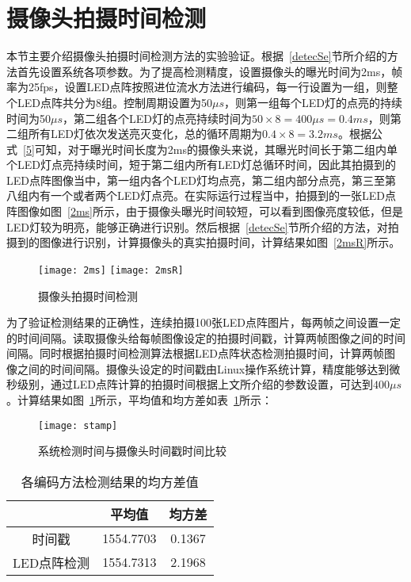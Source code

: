 \section{摄像头拍摄时间检测}

本节主要介绍摄像头拍摄时间检测方法的实验验证。根据~\ref{detecSe}节所介绍的方法首先设置系统各项参数。为了提高检测精度，设置摄像头的曝光时间为2ms，帧率为25fps，设置LED点阵按照进位流水方法进行编码，每一行设置为一组，则整个LED点阵共分为8组。控制周期设置为50$\mu s$，则第一组每个LED灯的点亮的持续时间为50$\mu s$，第二组各个LED灯的点亮持续时间为$50 \times 8 = 400\mu s = 0.4ms$，则第二组所有LED灯依次发送亮灭变化，总的循环周期为$0.4 \times 8 = 3.2ms$。根据公式~\ref{5}可知，对于曝光时间长度为2ms的摄像头来说，其曝光时间长于第二组内单个LED灯点亮持续时间，短于第二组内所有LED灯总循环时间，因此其拍摄到的LED点阵图像当中，第一组内各个LED灯均点亮，第二组内部分点亮，第三至第八组内有一个或者两个LED灯点亮。在实际运行过程当中，拍摄到的一张LED点阵图像如图~\ref{2ms}所示，由于摄像头曝光时间较短，可以看到图像亮度较低，但是LED灯较为明亮，能够正确进行识别。然后根据~\ref{detecSe}节所介绍的方法，对拍摄到的图像进行识别，计算摄像头的真实拍摄时间，计算结果如图~\ref{2msR}所示。

\begin{figure}[h] 
  \centering%
    {\texttt{[image: 2ms]}}
      {\texttt{[image: 2msR]}}
  \caption{摄像头拍摄时间检测}
\end{figure}

为了验证检测结果的正确性，连续拍摄100张LED点阵图片，每两帧之间设置一定的时间间隔。读取摄像头给每帧图像设定的拍摄时间戳，计算两帧图像之间的时间间隔。同时根据拍摄时间检测算法根据LED点阵状态检测拍摄时间，计算两帧图像之间的时间间隔。摄像头设定的时间戳由Linux操作系统计算，精度能够达到微秒级别，通过LED点阵计算的拍摄时间根据上文所介绍的参数设置，可达到$400\mu s$。计算结果如图~\ref{stamp}所示，平均值和均方差如表~\ref{codingT}所示：

\begin{figure}[h] 
  \centering
  \texttt{[image: stamp]}
  \caption{系统检测时间与摄像头时间戳时间比较}
    \label{stamp}
\end{figure}

\begin{table}[h]
  \centering
  \caption{各编码方法检测结果的均方差值} 
  \label{codingT}
  \begin{tabular}{|c|c|c|}\hline
  &  平均值 &  均方差 \\ \hline 
  时间戳 & 1554.7703 &0.1367\\ \hline
  LED点阵检测 & 1554.7313 & 2.1968\\ \hline
  \end{tabular}
\end{table}


